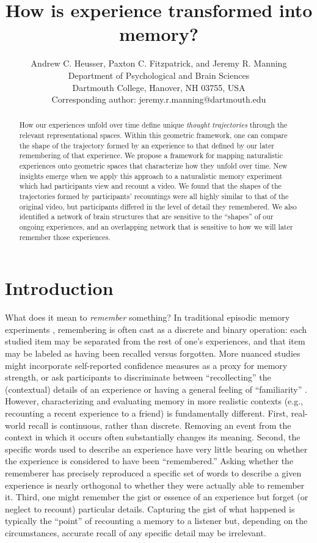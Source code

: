 \documentclass{article}
\title{How is experience transformed into memory?}
\author{Andrew C. Heusser, Paxton C. Fitzpatrick, and Jeremy R. Manning\\Department of Psychological and Brain Sciences\\Dartmouth College, Hanover, NH 03755, USA\\Corresponding author: jeremy.r.manning@dartmouth.edu}
\begin{document}
\maketitle

\begin{abstract}
  How our experiences unfold over time define unique \textit{thought
    trajectories} through the relevant representational spaces.
  Within this geometric framework, one can compare the shape of the
  trajectory formed by an experience to that defined by our later
  remembering of that experience.  We propose a framework for mapping
  naturalistic experiences onto geometric spaces that characterize how
  they unfold over time.  New insights emerge when we apply this
  approach to a naturalistic memory experiment which had participants
  view and recount a video.  We found that the shapes of the
  trajectories formed by participants' recountings were all highly
  similar to that of the original video, but participants differed in
  the level of detail they remembered.  We also identified a network
  of brain structures that are sensitive to the ``shapes'' of our
  ongoing experiences, and an overlapping network that is sensitive to
  how we will later remember those experiences.
\end{abstract}


\section*{Introduction}

What does it mean to \textit{remember} something? In traditional
episodic memory experiments \citep[e.g., list-learning or trial-based
experiments;][]{Murd62a, Kaha96}, remembering is often cast as a
discrete and binary operation: each studied item may be separated from
the rest of one's experiences, and that item may be labeled as having
been recalled versus forgotten. More nuanced studies might incorporate
self-reported confidence measures as a proxy for memory strength, or
ask participants to discriminate between ``recollecting'' the
(contextual) details of an experience or having a general feeling of
``familiarity'' \citep{Yone02}. However, characterizing and evaluating
memory in more realistic contexts (e.g., recounting a recent
experience to a friend) is fundamentally different.  First, real-world
recall is continuous, rather than discrete.  Removing an event from
the context in which it occurs often substantially changes its
meaning.  Second, the specific words used to describe an experience
have very little bearing on whether the experience is considered to
have been ``remembered.''  Asking whether the rememberer has precisely
reproduced a specific set of words to describe a given experience is
nearly orthogonal to whether they were actually able to remember it.
Third, one might remember the gist or essence of an experience but
forget (or neglect to recount) particular details.  Capturing the gist
of what happened is typically the ``point'' of recounting a memory to
a listener but, depending on the circumstances, accurate recall of any
specific detail may be irrelevant.
\end{document}
